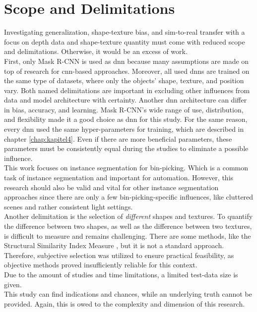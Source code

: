 	
	
	\section{Scope and Delimitations}
	\label{sec:scope-and-delimitations}
		Investigating generalization, shape-texture bias, and sim-to-real transfer with a focus on depth data and shape-texture quantity must come with reduced scope and delimitations. Otherwise, it would be an excess of work. \\
		First, only Mask R-CNN \cite{Kaiming2017} is used as \ac{dnn} because many assumptions are made on top of research for \ac{cnn}-based approaches.
		Moreover, all used \ac{dnn}s are trained on the same type of datasets, where only the objects' shape, texture, and position vary.
		Both named delimitations are important in excluding other influences from data and model architecture with certainty. Another \ac{dnn} architecture can differ in bias, accuracy, and learning. Mask R-CNN's wide range of use, distribution, and flexibility made it a good choice as \ac{dnn} for this study.
		For the same reason, every \ac{dnn} used the same hyper-parameters for training, which are described in chapter \ref{chap:kapitel4}. Even if there are more beneficial parameters, these parameters must be consistently equal during the studies to eliminate a possible influence.\\
		This work focuses on instance segmentation for bin-picking. Which is a common task of instance segmentation and important for automation\cite{Raj2023}\cite{Danielczuk2019}\cite{Xie2021}. However, this research should also be valid and vital for other instance segmentation approaches since there are only a few bin-picking-specific influences, like cluttered scenes and rather consistent light settings.\\
		Another delimitation is the selection of \textit{different} shapes and textures. To quantify the difference between two shapes, as well as the difference between two textures, is difficult to measure and remains challenging. There are some methods, like the Structural Similarity Index Measure \cite{Wang2004}, but it is not a standard approach. Therefore, subjective selection was utilized to ensure practical feasibility, as objective methods proved insufficiently reliable for this context.
		\\
		Due to the amount of studies and time limitations, a limited test-data size is given.\\
		This study can find indications and chances, while an underlying truth cannot be provided. Again, this is owed to the complexity and dimension of this research.\\
